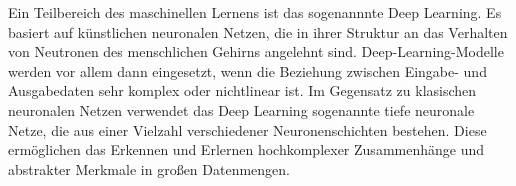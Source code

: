 Ein Teilbereich des maschinellen Lernens ist das sogenannnte Deep Learning. 
Es basiert auf künstlichen neuronalen Netzen, die in ihrer Struktur an das Verhalten von Neutronen des menschlichen Gehirns angelehnt sind.
Deep-Learning-Modelle werden vor allem dann eingesetzt, wenn die Beziehung zwischen Eingabe- und Ausgabedaten sehr komplex oder nichtlinear ist.
Im Gegensatz zu klasischen neuronalen Netzen verwendet das Deep Learning sogenannte tiefe neuronale Netze, die aus einer Vielzahl verschiedener Neuronenschichten bestehen.
Diese ermöglichen das Erkennen und Erlernen hochkomplexer Zusammenhänge und abstrakter Merkmale in großen Datenmengen.
\cite{DLDefinition}
















 


